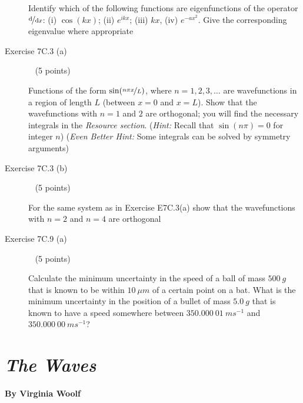\documentclass[10pt, letterpaper]{memoir}
\begin{document}
\begin{description}
	      Identify which of the following functions are eigenfunctions of the operator $\nicefrac{\mathrm{d}}{\mathrm{d}x}$: (i) $\cos(kx)$; (ii) $e^{ikx}$; (iii) $kx$, (iv) $e^{-ax^2}$. Give the corresponding eigenvalue where appropriate

	      \vspace{10em}
	\item [Exercise 7C.3 (a)] ~ (5 points)

	      Functions of the form $\sin(\nicefrac{n\pi x}{L})$, where $n=1,2,3,\ldots$ are wavefunctions in a region of length $L$ (between $x=0$ and $x=L$). Show that the wavefunctions with $n=1$ and $2$ are orthogonal; you will find the necessary integrals in the \emph{Resource section}. (\emph{Hint:} Recall that $\sin(n\pi)=0$ for integer $n$) (\emph{Even Better Hint:} Some integrals can be solved by symmetry arguments)

	      \vspace{10em}
	\item [Exercise 7C.3 (b)] ~ (5 points)

	      For the same system as in Exercise E7C.3(a) show that the wavefunctions with $n=2$ and $n=4$ are orthogonal

	      \vspace{10em}
	\item [Exercise 7C.9 (a)] ~ (5 points)

	      Calculate the minimum uncertainty in the speed of a ball of mass $500~g$ that is known to be within $10~\mu m$ of a certain point on a bat. What is the minimum uncertainty in the position of a bullet of mass $5.0~g$ that is known to have a speed somewhere between $350.000~01~ms^{-1}$ and $350.000~00~ms^{-1}$?
\end{description}

\newpage
\pagestyle{empty}
\addtocounter{page}{-1}

\section*{\emph{The Waves}}
\paragraph{By Virginia Woolf}~
\end{document}
